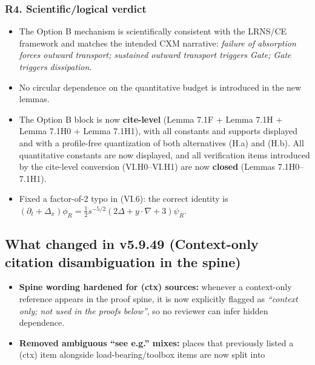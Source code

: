\documentclass[
  11pt,
]{article}
\providecommand{\tightlist}{%
  \setlength{\itemsep}{0pt}\setlength{\parskip}{0pt}}
\begin{document}
\hypertarget{r4.-scientificlogical-verdict}{%
\subsubsection{R4. Scientific/logical verdict}\label{r4.-scientificlogical-verdict}}

\begin{itemize}
\item
  The Option B mechanism is scientifically consistent with the LRNS/CE framework and matches the intended CXM narrative: \emph{failure of absorption forces outward transport; sustained outward transport triggers Gate; Gate triggers dissipation}.
\item
  No circular dependence on the quantitative budget is introduced in the new lemmas.
\item
  The Option B block is now \textbf{cite-level} (Lemma 7.1F + Lemma 7.1H + Lemma 7.1H0 + Lemma 7.1H1), with all constants and supports displayed and with a profile-free quantization of both alternatives (H.a) and (H.b). All quantitative constants are now displayed, and all verification items introduced by the cite-level conversion (VI.H0--VI.H1) are now \textbf{closed} (Lemmas 7.1H0--7.1H1).
\item
  Fixed a factor-of-2 typo in (VI.6): the correct identity is \((\partial_t+\Delta_x)\phi_R=\tfrac12 s^{-5/2}(2\Delta+y\cdot\nabla+3)\psi_R\).
\end{itemize}

\hypertarget{what-changed-in-v5.9.49-context-only-citation-disambiguation-in-the-spine}{%
\subsection{What changed in v5.9.49 (Context-only citation disambiguation in the spine)}\label{what-changed-in-v5.9.49-context-only-citation-disambiguation-in-the-spine}}

\begin{itemize}
\tightlist
\item
  \textbf{Spine wording hardened for (ctx) sources:} whenever a context-only reference appears in the proof spine, it is now explicitly flagged as \emph{``context only; not used in the proofs below''}, so no reviewer can infer hidden dependence.
\item
  \textbf{Removed ambiguous ``see e.g.'' mixes:} places that previously listed a (ctx) item alongside load-bearing/toolbox items are now split into
\end{itemize}
\end{document}
